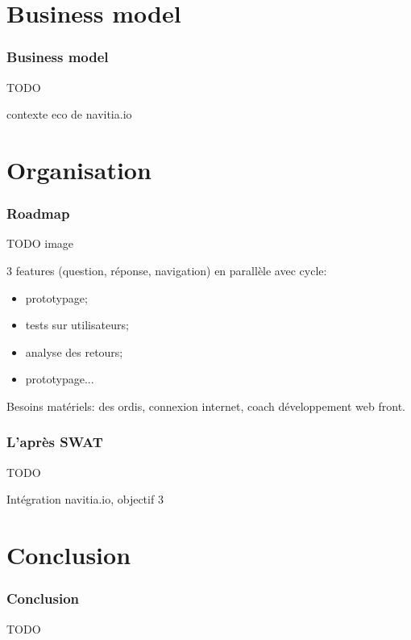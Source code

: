 \documentclass[table]{beamer}
\begin{document}
\section{Business model}

\begin{frame}
  \frametitle{Business model}

  TODO

  contexte eco de navitia.io
\end{frame}

\section{Organisation}

\begin{frame}
  \frametitle{Roadmap}

  TODO image

  3 features (question, réponse, navigation) en parallèle avec cycle:
  \begin{itemize}
  \item prototypage;
  \item tests sur utilisateurs;
  \item analyse des retours;
  \item prototypage...
  \end{itemize}

  Besoins matériels: des ordis, connexion internet, coach
  développement web front.
\end{frame}

\begin{frame}
  \frametitle{L'après SWAT}

  TODO

  Intégration navitia.io, objectif 3
\end{frame}

\section{Conclusion}

\begin{frame}
  \frametitle{Conclusion}

  TODO
\end{frame}

\begin{frame}
  \titlepage
\end{frame}
\end{document}

